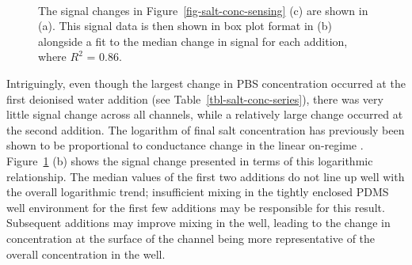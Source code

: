 \documentclass[
  a4paper,
]{scrbook}
\begin{document}
\begin{figure}
\begin{minipage}[t]{0.65\linewidth}
{{}

}

\end{minipage}%
%
\begin{minipage}[t]{0.17\linewidth}

{\centering 

~

}

\end{minipage}%

\caption[Signal changes from the previous figure, alongside a fit to the
median change in signal for each
addition.]{\label{fig-salt-conc-signal}The signal changes in
Figure~\ref{fig-salt-conc-sensing} (c) are shown in (a). This signal
data is then shown in box plot format in (b) alongside a fit to the
median change in signal for each addition, where \(R^2\) = 0.86.}

\end{figure}

Intriguingly, even though the largest change in PBS concentration
occurred at the first deionised water addition (see
Table~\ref{tbl-salt-conc-series}), there was very little signal change
across all channels, while a relatively large change occurred at the
second addition. The logarithm of final salt concentration has
previously been shown to be proportional to conductance change in the
linear on-regime \autocite{Heller2010}.
Figure~\ref{fig-salt-conc-signal} (b) shows the signal change presented
in terms of this logarithmic relationship. The median values of the
first two additions do not line up well with the overall logarithmic
trend; insufficient mixing in the tightly enclosed PDMS well environment
for the first few additions may be responsible for this result.
Subsequent additions may improve mixing in the well, leading to the
change in concentration at the surface of the channel being more
representative of the overall concentration in the well.
\end{document}
